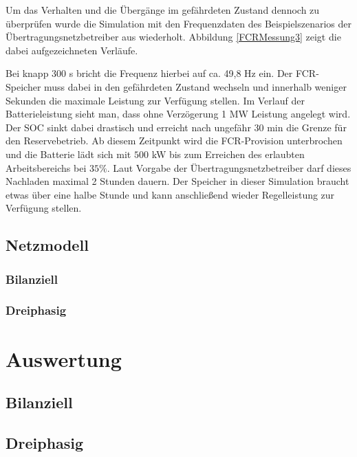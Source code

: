 Um das Verhalten und die Übergänge im gefährdeten Zustand dennoch zu überprüfen wurde die Simulation mit den Frequenzdaten
des Beispielszenarios der Übertragungsnetzbetreiber aus \parencite[]{Reservebetrieb} wiederholt.
Abbildung \ref{FCRMessung3} zeigt die dabei aufgezeichneten Verläufe.

Bei knapp 300 s bricht die Frequenz hierbei auf ca. 49,8 Hz ein.
Der FCR-Speicher muss dabei in den gefährdeten Zustand wechseln und innerhalb weniger Sekunden
die maximale Leistung zur Verfügung stellen.
Im Verlauf der Batterieleistung sieht man, dass ohne Verzögerung 1 MW Leistung angelegt wird.
Der SOC sinkt dabei drastisch und erreicht nach ungefähr 30 min die Grenze für den Reservebetrieb.
Ab diesem Zeitpunkt wird die FCR-Provision unterbrochen und die Batterie lädt sich mit $500$ kW 
bis zum Erreichen des erlaubten Arbeitsbereichs bei $35 \%$.
Laut Vorgabe der Übertragungsnetzbetreiber darf dieses Nachladen maximal 2 Stunden dauern.
Der Speicher in dieser Simulation braucht etwas über eine halbe Stunde und kann anschließend wieder
Regelleistung zur Verfügung stellen.



\section{Netzmodell}
\subsection{Bilanziell}
\subsection{Dreiphasig}\label{3phase}


\chapter{Auswertung}

\section{Bilanziell}

\section{Dreiphasig}
